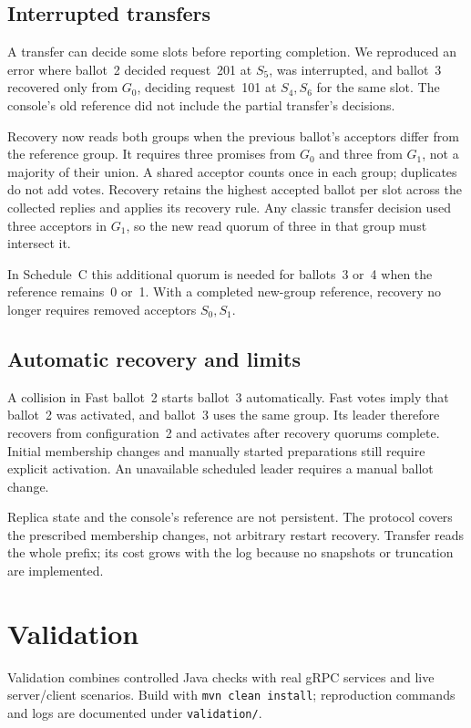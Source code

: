 \documentclass[times,10pt,twocolumn]{article}
\newcommand{\code}[1]{\texttt{\small #1}}
\begin{document}
\subsection{Interrupted transfers}
A transfer can decide some slots before reporting completion. We reproduced
an error where ballot~2 decided request~201 at $S_5$, was interrupted, and
ballot~3 recovered only from $G_0$, deciding request~101 at $S_4,S_6$ for
the same slot. The console's old reference did not include the partial
transfer's decisions.

Recovery now reads both groups when the previous ballot's acceptors differ
from the reference group. It requires three promises from $G_0$ and three
from $G_1$, not a majority of their union. A shared acceptor counts once in
each group; duplicates do not add votes. Recovery retains the highest accepted
ballot per slot across the collected replies and applies its recovery rule.
Any classic transfer decision used three acceptors in $G_1$, so the new read
quorum of three in that group must intersect it.

In Schedule~C this additional quorum is needed for ballots~3 or~4 when the
reference remains~0 or~1. With a completed new-group reference, recovery no
longer requires removed acceptors $S_0,S_1$.

\subsection{Automatic recovery and limits}
A collision in Fast ballot~2 starts ballot~3 automatically. Fast votes imply
that ballot~2 was activated, and ballot~3 uses the same group. Its leader
therefore recovers from configuration~2 and activates after recovery quorums
complete. Initial membership changes and manually started preparations still
require explicit activation. An unavailable scheduled leader requires a
manual ballot change.

Replica state and the console's reference are not persistent. The protocol
covers the prescribed membership changes, not arbitrary restart recovery.
Transfer reads the whole prefix; its cost grows with the log because no
snapshots or truncation are implemented.

\section{Validation}
\label{sec:eval}
Validation combines controlled Java checks with real gRPC services and live
server/client scenarios. Build with \code{mvn clean install}; reproduction
commands and logs are documented under \code{validation/}.
\end{document}
